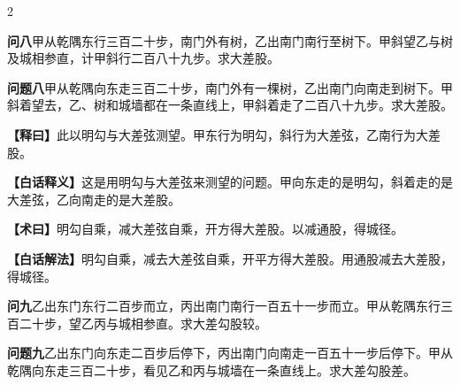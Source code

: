 \documentclass[11pt,a4paper]{article}
\newcommand{\WenQuestion}[1]{\textbf{\textcolor{classicalcolor}{#1}}}
\newcommand{\BaiQuestion}[1]{\textbf{\textcolor{moderncolor}{#1}}}
\newcommand{\WenExplain}{\textcolor{classicalcolor}{\textbf{【释曰】}}}
\newcommand{\BaiExplain}{\textcolor{moderncolor}{\textbf{【白话释义】}}}
\newcommand{\WenMethod}{\textcolor{classicalcolor}{\textbf{【术曰】}}}
\newcommand{\BaiMethod}{\textcolor{moderncolor}{\textbf{【白话解法】}}}
\begin{document}
\begin{paracol}{2}
\vspace{0.8em}

\switchcolumn*
\begin{tcolorbox}[colback=red!3,colframe=red!30!black,boxrule=0.3pt]
\WenQuestion{问八}\quad 甲从乾隅东行三百二十步，南门外有树，乙出南门南行至树下。甲斜望乙与树及城相参直，计甲斜行二百八十九步。求大差股。
\end{tcolorbox}
\switchcolumn
\begin{tcolorbox}[colback=blue!3,colframe=blue!30!black,boxrule=0.3pt]
\BaiQuestion{问题八}\quad 甲从乾隅向东走三百二十步，南门外有一棵树，乙出南门向南走到树下。甲斜着望去，乙、树和城墙都在一条直线上，甲斜着走了二百八十九步。求大差股。
\end{tcolorbox}

\switchcolumn*
\begin{tcolorbox}[colback=red!5,colframe=red!30!black,boxrule=0.3pt]
\WenExplain\quad 此以明勾与大差弦测望。甲东行为明勾，斜行为大差弦，乙南行为大差股。
\end{tcolorbox}
\switchcolumn
\begin{tcolorbox}[colback=blue!5,colframe=blue!30!black,boxrule=0.3pt]
\BaiExplain\quad 这是用明勾与大差弦来测望的问题。甲向东走的是明勾，斜着走的是大差弦，乙向南走的是大差股。
\end{tcolorbox}

\switchcolumn*
\begin{tcolorbox}[colback=red!5,colframe=red!40!black,boxrule=0.3pt]
\WenMethod\quad 明勾自乘，减大差弦自乘，开方得大差股。以减通股，得城径。
\end{tcolorbox}
\switchcolumn
\begin{tcolorbox}[colback=blue!5,colframe=blue!40!black,boxrule=0.3pt]
\BaiMethod\quad 明勾自乘，减去大差弦自乘，开平方得大差股。用通股减去大差股，得城径。
\end{tcolorbox}

\vspace{0.8em}

\switchcolumn*
\begin{tcolorbox}[colback=red!3,colframe=red!30!black,boxrule=0.3pt]
\WenQuestion{问九}\quad 乙出东门东行二百步而立，丙出南门南行一百五十一步而立。甲从乾隅东行三百二十步，望乙丙与城相参直。求大差勾股较。
\end{tcolorbox}
\switchcolumn
\begin{tcolorbox}[colback=blue!3,colframe=blue!30!black,boxrule=0.3pt]
\BaiQuestion{问题九}\quad 乙出东门向东走二百步后停下，丙出南门向南走一百五十一步后停下。甲从乾隅向东走三百二十步，看见乙和丙与城墙在一条直线上。求大差勾股差。
\end{tcolorbox}


\end{paracol}
\end{document}
